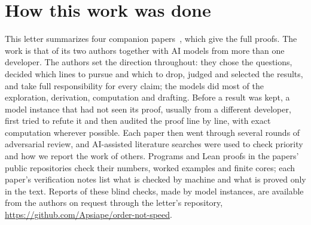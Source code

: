 \documentclass[11pt]{article}
\begin{document}
\section*{How this work was done}
This letter summarizes four companion papers~\cite{Order,SaveWork,Answering,KeepingTime}, which give the full proofs. The work is that of its two authors together with AI models from more than one developer. The authors set the direction throughout: they chose the questions, decided which lines to pursue and which to drop, judged and selected the results, and take full responsibility for every claim; the models did most of the exploration, derivation, computation and drafting. Before a result was kept, a model instance that had not seen its proof, usually from a different developer, first tried to refute it and then audited the proof line by line, with exact computation wherever possible. Each paper then went through several rounds of adversarial review, and AI-assisted literature searches were used to check priority and how we report the work of others. Programs and Lean proofs in the papers' public repositories check their numbers, worked examples and finite cores; each paper's verification notes list what is checked by machine and what is proved only in the text. Reports of these blind checks, made by model instances, are available from the authors on request through the letter's repository, \url{https://github.com/Apsiape/order-not-speed}.



\end{document}
